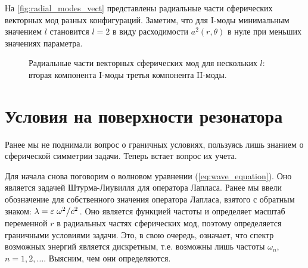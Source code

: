 \documentclass[12pt,a4paper]{article}
\begin{document}
        На \autoref{fig:radial_modes_vect} представлены радиальные части сферических векторных мод разных конфигураций. Заметим, что для $\mathrm{I}$-моды минимальным значением $l$ становится $l = 2$ в виду расходимости $a^2(r,\theta)$ в нуле при меньших значениях параметра.
        \begin{figure}[h]
            \centering
            \hspace{8pt}%
            \hspace{8pt}%
            \caption[]{Радиальные части векторных сферических мод для нескольких $l$: %
                 вторая компонента $\mathrm{I}$-моды %
                 третья компонента $\mathrm{II}$-моды. %
            } %
            \label{fig:radial_modes_vect}%
        \end{figure}


    \section{Условия на поверхности резонатора}

        Ранее мы не поднимали вопрос о граничных условиях, пользуясь лишь знанием о сферической симметрии задачи. Теперь встает вопрос их учета.

        Для начала снова поговорим о волновом уравнении (\autoref{eq:wave_equation}). Оно является задачей Штурма-Лиувилля для оператора Лапласа. Ранее мы ввели обозначение для собственного значения оператора Лапласа, взятого с обратным знаком: $\lambda = \varepsilon \flatfrac{\omega^2}{c^2}$. Оно является функцией частоты и определяет масштаб переменной $r$ в радиальных частях сферических мод, поэтому определяется граничными условиями задачи. Это, в свою очередь, означает, что спектр возможных энергий является дискретным, т.е. возможны лишь частоты $\omega_n$, $n = 1, 2, \dots$. Выясним, чем они определяются.
\end{document}
